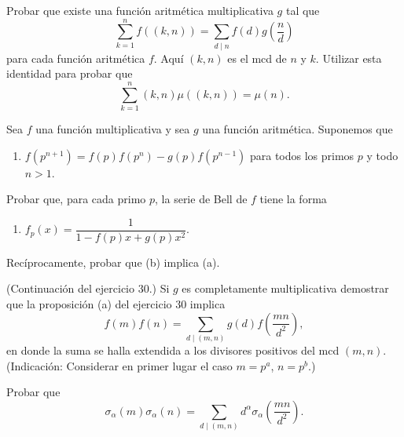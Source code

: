 \documentclass[12pt,a4paper]{book}
\begin{document}
    \begin{ejercicio}
        Probar que existe una función aritmética multiplicativa $g$ tal que
        \begin{equation*}
            \sum_{k=1}^{n}f((k,n))=\sum_{d\mid n}f(d)g\left(\frac{n}{d}\right)
        \end{equation*}
        para cada función aritmética $f$. Aquí $(k,n)$ es el mcd de $n$ y $k$. Utilizar
        esta identidad para probar que
        \begin{equation*}
            \sum_{k=1}^{n}(k,n)\mu((k,n))=\mu(n).
        \end{equation*}
    \end{ejercicio}

    \begin{ejercicio}
        Sea $f$ una función multiplicativa y sea $g$ una función aritmética. Suponemos que
        \begin{enumerate}
            \item[(a)] $f(p^{n+1})=f(p)f(p^n)-g(p)f(p^{n-1})$ para todos los primos $p$ y
            todo $n>1$.
        \end{enumerate}
        Probar que, para cada primo $p$, la serie de Bell de $f$ tiene la forma
        \begin{enumerate}
            \item[(b)] $f_p(x)=\dfrac{1}{1-f(p)x+g(p)x^2}$.
        \end{enumerate}
        Recíprocamente, probar que (b) implica (a).
    \end{ejercicio}

    \begin{ejercicio}
        (Continuación del ejercicio 30.) Si $g$ es completamente multiplicativa demostrar
        que la proposición (a) del ejercicio 30 implica
        \begin{equation*}
            f(m)f(n)=\sum_{d\mid(m,n)}g(d)f\left(\frac{mn}{d^2}\right),
        \end{equation*}
        en donde la suma se halla extendida a los divisores positivos del mcd $(m,n)$.
        (Indicación: Considerar en primer lugar el caso $m=p^a$, $n=p^b$.)
    \end{ejercicio}

    \begin{ejercicio}
        Probar que
        \begin{equation*}
            \sigma_\alpha(m)\sigma_\alpha(n)=\sum_{d\mid(m,n)}d^\alpha\sigma_\alpha\left(\frac{mn}{d^2}\right).
        \end{equation*}
    \end{ejercicio}
\end{document}
